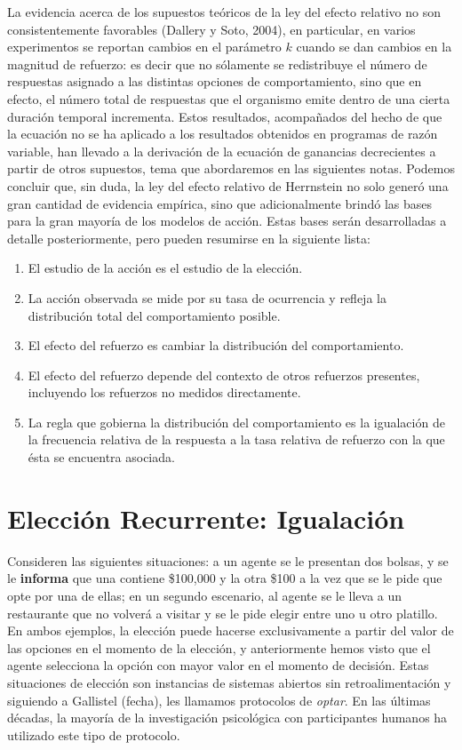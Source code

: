 \documentclass[
  a4paper,
  DIV=11,
  numbers=noendperiod]{scrreprt}
\begin{document}
La evidencia acerca de los supuestos teóricos de la ley del efecto
relativo no son consistentemente favorables (Dallery y Soto, 2004), en
particular, en varios experimentos se reportan cambios en el parámetro
\(k\) cuando se dan cambios en la magnitud de refuerzo: es decir que no
sólamente se redistribuye el número de respuestas asignado a las
distintas opciones de comportamiento, sino que en efecto, el número
total de respuestas que el organismo emite dentro de una cierta duración
temporal incrementa. Estos resultados, acompañados del hecho de que la
ecuación no se ha aplicado a los resultados obtenidos en programas de
razón variable, han llevado a la derivación de la ecuación de ganancias
decrecientes a partir de otros supuestos, tema que abordaremos en las
siguientes notas. Podemos concluir que, sin duda, la ley del efecto
relativo de Herrnstein no solo generó una gran cantidad de evidencia
empírica, sino que adicionalmente brindó las bases para la gran mayoría
de los modelos de acción. Estas bases serán desarrolladas a detalle
posteriormente, pero pueden resumirse en la siguiente lista:

\begin{enumerate}
\def\labelenumi{\arabic{enumi}.}
\item
  El estudio de la acción es el estudio de la elección.
\item
  La acción observada se mide por su tasa de ocurrencia y refleja la
  distribución total del comportamiento posible.
\item
  El efecto del refuerzo es cambiar la distribución del comportamiento.
\item
  El efecto del refuerzo depende del contexto de otros refuerzos
  presentes, incluyendo los refuerzos no medidos directamente.
\item
  La regla que gobierna la distribución del comportamiento es la
  igualación de la frecuencia relativa de la respuesta a la tasa
  relativa de refuerzo con la que ésta se encuentra asociada.
\end{enumerate}


\chapter{Elección Recurrente:
Igualación}\label{elecciuxf3n-recurrente-igualaciuxf3n}

Consideren las siguientes situaciones: a un agente se le presentan dos
bolsas, y se le \textbf{informa} que una contiene \$100,000 y la otra
\$100 a la vez que se le pide que opte por una de ellas; en un segundo
escenario, al agente se le lleva a un restaurante que no volverá a
visitar y se le pide elegir entre uno u otro platillo. En ambos
ejemplos, la elección puede hacerse exclusivamente a partir del valor de
las opciones en el momento de la elección, y anteriormente hemos visto
que el agente selecciona la opción con mayor valor en el momento de
decisión. Estas situaciones de elección son instancias de sistemas
abiertos sin retroalimentación y siguiendo a Gallistel (fecha), les
llamamos protocolos de \emph{optar}. En las últimas décadas, la mayoría
de la investigación psicológica con participantes humanos ha utilizado
este tipo de protocolo.
\end{document}
